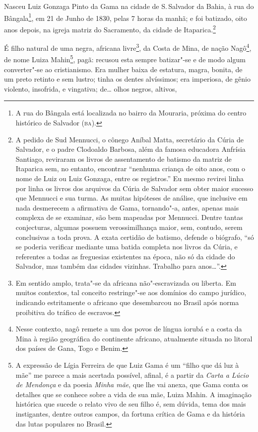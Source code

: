 Nasceu Luiz Gonzaga Pinto da Gama na cidade de S.\,Salvador da Bahia, à
rua do Bângala\footnote{A rua do Bângala está localizada no bairro da
  Mouraria, próxima do centro histórico de Salvador (\textsc{ba}).}, em 21 de
Junho de 1830, pelas 7 horas da manhã; e foi batizado, oito anos depois,
na igreja matriz do Sacramento, da cidade de Itaparica.\footnote{A
  pedido de Sud Mennucci, o cônego Aníbal Matta, secretário da Cúria de
  Salvador, e o padre Clodoaldo Barbosa, além da famosa educadora
  Anfrísia Santiago, reviraram os livros de assentamento de batismo da
  matriz de Itaparica sem, no entanto, encontrar ``nenhuma criança de
  oito anos, com o nome de Luiz ou Luiz Gonzaga, entre os registros.'' Eu
  mesmo revirei linha por linha os livros dos arquivos da Cúria de
  Salvador sem obter maior sucesso que Mennucci e sua turma. As muitas
  hipóteses de análise, que inclusive em nada desmerecem a afirmativa de
  Gama, tornando"-a, antes, apenas mais complexa de se examinar, são bem
  mapeadas por Mennucci. Dentre tantas conjecturas, algumas possuem
  verossimilhança maior, sem, contudo, serem conclusivas a toda prova. A
  exata certidão de batismo, defende o biógrafo, ``só se poderia
  verificar mediante uma batida completa nos livros da Cúria, e
  referentes a todas as freguesias existentes na época, não só da cidade
  do Salvador, mas também das cidades vizinhas. Trabalho para anos\ldots{}''.}

É filho natural de uma negra, africana livre\footnote{Em sentido
  amplo, trata"-se da africana não"-escravizada ou liberta. Em muitos
  contextos, tal conceito restringe"-se aos domínios do campo jurídico,
  indicando estritamente o africano que desembarcou no Brasil após norma
  proibitiva do tráfico de escravos.}, da Costa de Mina, de nação
Nagô\footnote{Nesse contexto, nagô remete a um dos povos de língua
  iorubá e a costa da Mina à região geográfica do continente africano,
  atualmente situada no litoral dos países de Gana, Togo e Benim.}, de
nome Luiza Mahin\footnote{A expressão de Lígia Ferreira de que Luiz
  Gama é um ``filho que dá luz à mãe'' me parece a mais acertada possível,
  afinal, é a partir da \emph{Carta a Lúcio de Mendonça} e da poesia
  \emph{Minha mãe}, que lhe vai anexa, que Gama conta os detalhes que
  se conhece sobre a vida de sua mãe, Luiza Mahin. A imaginação histórica
  que sucede o relato vivo de seu filho é, sem dúvida, tema dos mais
  instigantes, dentre outros campos, da fortuna crítica de Gama e da
  história das lutas populares no Brasil.}, pagã: recusou esta sempre
batizar"-se e de modo algum converter"-se ao cristianismo. Era mulher
baixa de estatura, magra, bonita, de um preto retinto e sem lustro;
tinha os dentes alvíssimos; era imperiosa, de gênio violento, insofrida,
e vingativa; de\ldots{} olhos negros, altivos,

